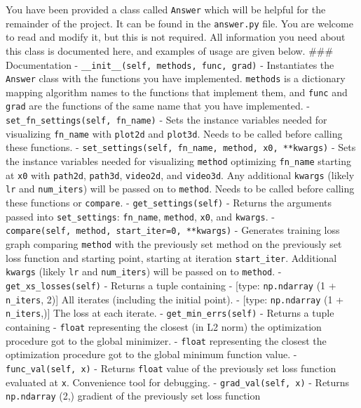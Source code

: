 \documentclass[11pt]{article}
\begin{document}
You have been provided a class called \texttt{Answer} which will be
helpful for the remainder of the project. It can be found in the
\texttt{answer.py} file. You are welcome to read and modify it, but this
is not required. All information you need about this class is documented
here, and examples of usage are given below. \#\#\# Documentation -
\texttt{\_\_init\_\_(self,\ methods,\ func,\ grad)} - Instantiates the
\texttt{Answer} class with the functions you have implemented.
\texttt{methods} is a dictionary mapping algorithm names to the
functions that implement them, and \texttt{func} and \texttt{grad} are
the functions of the same name that you have implemented. -
\texttt{set\_fn\_settings(self,\ fn\_name)} - Sets the instance
variables needed for visualizing \texttt{fn\_name} with \texttt{plot2d}
and \texttt{plot3d}. Needs to be called before calling these functions.
- \texttt{set\_settings(self,\ fn\_name,\ method,\ x0,\ **kwargs)} -
Sets the instance variables needed for visualizing \texttt{method}
optimizing \texttt{fn\_name} starting at \texttt{x0} with
\texttt{path2d}, \texttt{path3d}, \texttt{video2d}, and
\texttt{video3d}. Any additional \texttt{kwargs} (likely \texttt{lr} and
\texttt{num\_iters}) will be passed on to \texttt{method}. Needs to be
called before calling these functions or \texttt{compare}. -
\texttt{get\_settings(self)} - Returns the arguments passed into
\texttt{set\_settings}: \texttt{fn\_name}, \texttt{method}, \texttt{x0},
and \texttt{kwargs}. -
\texttt{compare(self,\ method,\ start\_iter=0,\ **kwargs)} - Generates
training loss graph comparing \texttt{method} with the previously set
method on the previously set loss function and starting point, starting
at iteration \texttt{start\_iter}. Additional \texttt{kwargs} (likely
\texttt{lr} and \texttt{num\_iters}) will be passed on to
\texttt{method}. - \texttt{get\_xs\_losses(self)} - Returns a tuple
containing - {[}type: \texttt{np.ndarray} (1 + \texttt{n\_iters}, 2){]}
All iterates (including the initial point). - {[}type:
\texttt{np.ndarray} (1 + \texttt{n\_iters},){]} The loss at each
iterate. - \texttt{get\_min\_errs(self)} - Returns a tuple containing -
\texttt{float} representing the closest (in L2 norm) the optimization
procedure got to the global minimizer. - \texttt{float} representing the
closest the optimization procedure got to the global minimum function
value. - \texttt{func\_val(self,\ x)} - Returns \texttt{float} value of
the previously set loss function evaluated at \texttt{x}. Convenience
tool for debugging. - \texttt{grad\_val(self,\ x)} - Returns
\texttt{np.ndarray} (2,) gradient of the previously set loss function
\end{document}
